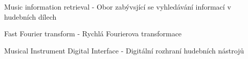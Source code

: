 \cleardoublepage
\chapter*{\listofabbrevname}
{}

\begin{acronym}[KolikMista]
		{Music information retrieval - Obor zabývsjící se vyhledávání informací v hudebních dílech}

		{Fast Fourier transform - Rychlá Fourierova transformace}
	
		{Musical Instrument Digital Interface - Digitální rozhraní hudebních nástrojů}

\end{acronym}
